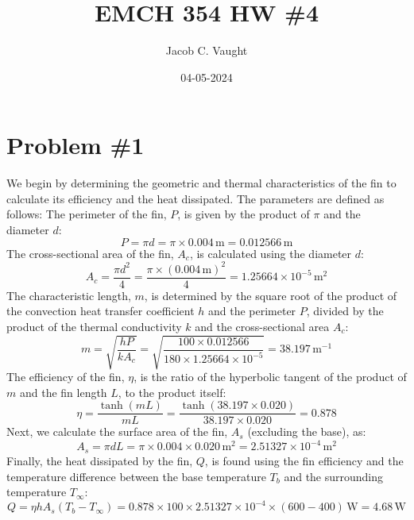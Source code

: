 \documentclass{article}
\title{EMCH 354 HW \#4}
\author{Jacob C. Vaught}
\date{04-05-2024}
\numberwithin{equation}{section}
\begin{document}
\maketitle
\section{Problem \#1}
We begin by determining the geometric and thermal characteristics of the fin to calculate its efficiency and the heat dissipated. The parameters are defined as follows:
\newline\newline
The perimeter of the fin, $P$, is given by the product of $\pi$ and the diameter $d$:
\begin{equation}
P = \pi d = \pi \times 0.004 \, \text{m} = 0.012566 \, \text{m}
\end{equation}
\noindent
The cross-sectional area of the fin, $A_c$, is calculated using the diameter $d$:
\begin{equation}
A_c = \frac{\pi d^2}{4} = \frac{\pi \times (0.004 \, \text{m})^2}{4} = 1.25664 \times 10^{-5} \, \text{m}^2
\end{equation}
\noindent
The characteristic length, $m$, is determined by the square root of the product of the convection heat transfer coefficient $h$ and the perimeter $P$, divided by the product of the thermal conductivity $k$ and the cross-sectional area $A_c$:
\begin{equation}
m = \sqrt{\frac{hP}{kA_c}} = \sqrt{\frac{100 \times 0.012566}{180 \times 1.25664 \times 10^{-5}}} = 38.197 \, \text{m}^{-1}
\end{equation}
\noindent
The efficiency of the fin, $\eta$, is the ratio of the hyperbolic tangent of the product of $m$ and the fin length $L$, to the product itself:
\begin{equation}
\eta = \frac{\tanh(mL)}{mL} = \frac{\tanh(38.197 \times 0.020)}{38.197 \times 0.020} = 0.878
\end{equation}
\noindent
Next, we calculate the surface area of the fin, $A_s$ (excluding the base), as:
\begin{equation}
A_s = \pi d L = \pi \times 0.004 \times 0.020 \, \text{m}^2 = 2.51327 \times 10^{-4} \, \text{m}^2
\end{equation}
\noindent
Finally, the heat dissipated by the fin, $Q$, is found using the fin efficiency and the temperature difference between the base temperature $T_b$ and the surrounding temperature $T_\infty$:
\begin{equation}
Q = \eta h A_s (T_b - T_\infty) = 0.878 \times 100 \times 2.51327 \times 10^{-4} \times (600 - 400) \, \text{W} = 4.68 \, \text{W}
\end{equation}
\end{document}
